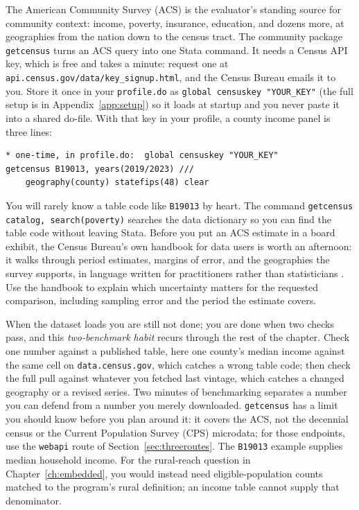 The American Community Survey (ACS) is the evaluator's standing source for community context: income, poverty, insurance, education, and dozens more, at geographies from the nation down to the census tract. The community package \texttt{getcensus} turns an ACS query into one Stata command. It needs a Census API key, which is free and takes a minute: request one at \texttt{api.census.gov/data/key\_signup.html}, and the Census Bureau emails it to you. Store it once in your \texttt{profile.do} as \texttt{global censuskey "YOUR\_KEY"} (the full setup is in Appendix~\ref{app:setup}) so it loads at startup and you never paste it into a shared do-file. With that key in your profile, a county income panel is three lines:
\par
{\footnotesize
\begin{verbatim}
* one-time, in profile.do:  global censuskey "YOUR_KEY"
getcensus B19013, years(2019/2023) ///
    geography(county) statefips(48) clear
\end{verbatim}
}
You will rarely know a table code like \texttt{B19013} by heart. The command \texttt{getcensus catalog, search(poverty)} searches the data dictionary so you can find the table code without leaving Stata. Before you put an ACS estimate in a board exhibit, the Census Bureau's own handbook for data users is worth an afternoon: it walks through period estimates, margins of error, and the geographies the survey supports, in language written for practitioners rather than statisticians \parencite{census2020acs}. Use the handbook to explain which uncertainty matters for the requested comparison, including sampling error and the period the estimate covers.

When the dataset loads you are still not done; you are done when two checks pass, and this \emph{two-benchmark habit} recurs through the rest of the chapter. Check one number against a published table, here one county's median income against the same cell on \texttt{data.census.gov}, which catches a wrong table code; then check the full pull against whatever you fetched last vintage, which catches a changed geography or a revised series. Two minutes of benchmarking separates a number you can defend from a number you merely downloaded. \texttt{getcensus} has a limit you should know before you plan around it: it covers the ACS, not the decennial census or the Current Population Survey (CPS) microdata; for those endpoints, use the \texttt{webapi} route of Section~\ref{sec:threeroutes}. The \texttt{B19013} example supplies median household income. For the rural-reach question in Chapter~\ref{ch:embedded}, you would instead need eligible-population counts matched to the program's rural definition; an income table cannot supply that denominator.

